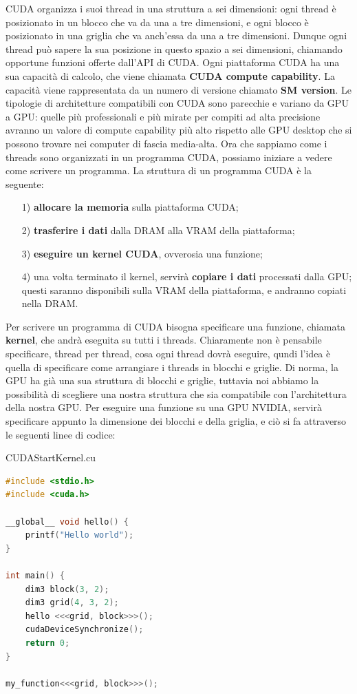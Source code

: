 CUDA organizza i suoi thread in una struttura a sei dimensioni: ogni thread è posizionato in un blocco che va da una a tre dimensioni, e ogni blocco è posizionato in una griglia che va anch'essa da una a tre dimensioni. Dunque ogni thread può sapere la sua posizione in questo spazio a sei dimensioni, chiamando opportune funzioni offerte dall'API di CUDA.
\nl
Ogni piattaforma CUDA ha una sua capacità di calcolo, che viene chiamata \textbf{CUDA compute capability}. La capacità viene rappresentata da un numero di versione chiamato \textbf{SM version}. Le tipologie di architetture compatibili con CUDA sono parecchie e variano da GPU a GPU: quelle più professionali e più mirate per compiti ad alta precisione avranno un valore di compute capability più alto rispetto alle GPU desktop che si possono trovare nei computer di fascia media-alta. 
\nl
Ora che sappiamo come i threads sono organizzati in un programma CUDA, possiamo iniziare a vedere come scrivere un programma. La struttura di un programma CUDA è la seguente:
\begin{itemize}
    \item [1)] \textbf{allocare la memoria} sulla piattaforma CUDA;
    \item [2)] \textbf{trasferire i dati} dalla DRAM alla VRAM della piattaforma;
    \item [3)] \textbf{eseguire un kernel CUDA}, ovverosia una funzione;
    \item [4)] una volta terminato il kernel, servirà \textbf{copiare i dati} processati dalla GPU; questi saranno disponibili sulla VRAM della piattaforma, e andranno copiati nella DRAM.
\end{itemize}

Per scrivere un programma di CUDA bisogna specificare una funzione, chiamata \textbf{kernel}, che andrà eseguita su tutti i threads. Chiaramente non è pensabile specificare, thread per thread, cosa ogni thread dovrà eseguire, qundi l'idea è quella di specificare come arrangiare i threads in blocchi e griglie. Di norma, la GPU ha già una sua struttura di blocchi e griglie, tuttavia noi abbiamo la possibilità di scegliere una nostra struttura che sia compatibile con l'architettura della nostra GPU.
\nl
Per eseguire una funzione su una GPU NVIDIA, servirà specificare appunto la dimensione dei blocchi e della griglia, e ciò si fa attraverso le seguenti linee di codice:

\begin{codeblock}{CUDAStartKernel.cu}
    \begin{lstlisting}[language = C]
#include <stdio.h>
#include <cuda.h>

__global__ void hello() {
    printf("Hello world");
}

int main() {
    dim3 block(3, 2);
    dim3 grid(4, 3, 2);
    hello <<<grid, block>>>();
    cudaDeviceSynchronize();
    return 0;
}

my_function<<<grid, block>>>();\end{lstlisting}
\end{codeblock}